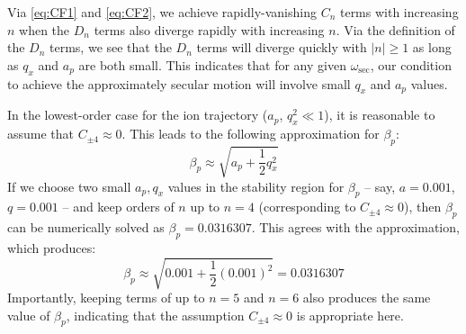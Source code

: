\documentclass{article}
\begin{document}
\medskip
\noindent Via \eqref{eq:CF1} and \eqref{eq:CF2}, we achieve rapidly-vanishing $C_{n}$ terms with increasing $n$ when the $D_{n}$ terms also diverge rapidly with increasing $n$. Via the definition of the $D_{n}$ terms, we see that the $D_{n}$ terms will diverge quickly with $|n| \ge 1$ as long as $q_x$ and $a_p$ are both small. This indicates that for any given $\omega_{\text{sec}}$, our condition to achieve the approximately secular motion will involve small $q_x$ and $a_p$ values. \par
\medskip
\noindent In the lowest-order case for the ion trajectory ($a_p$, $q_x^2 \ll 1$), it is reasonable to assume that $C_{\pm 4} \approx 0$. This leads to the following approximation for $\beta_p$:
\begin{equation}
\beta_p \approx \sqrt{a_p + \frac{1}{2}q_x^2}	
\end{equation}
If we choose two small $a_p, q_x$ values in the stability region for $\beta_p$ -- say, $a = 0.001$, $q = 0.001$ -- and keep orders of $n$ up to $n = 4$ (corresponding to $C_{\pm 4} \approx 0$), then $\beta_p$ can be numerically solved as $\beta_p = 0.0316307$. This agrees with the approximation, which produces:
\begin{equation*}
\beta_p \approx \sqrt{0.001 + \frac{1}{2}(0.001)^2} = 0.0316307
\end{equation*}
Importantly, keeping terms of up to $n = 5$ and $n = 6$ also produces the same value of $\beta_p$, indicating that the assumption $C_{\pm 4} \approx 0$ is appropriate here. 
\end{document}

